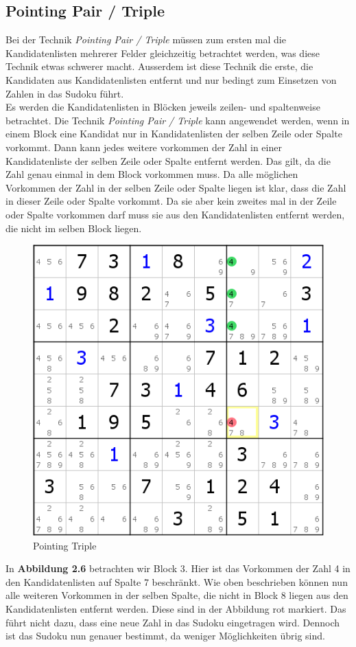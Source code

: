 \newpage
\subsection{Pointing Pair / Triple}
Bei der Technik \textit{Pointing Pair / Triple} müssen zum ersten mal die Kandidatenlisten mehrerer Felder gleichzeitig betrachtet werden, was diese Technik etwas schwerer macht. Ausserdem ist diese Technik die erste, die Kandidaten aus Kandidatenlisten entfernt und nur bedingt zum Einsetzen von Zahlen in das Sudoku führt.\\
Es werden die Kandidatenlisten in Blöcken jeweils zeilen- und spaltenweise betrachtet. Die Technik \textit{Pointing Pair / Triple}
kann angewendet werden, wenn in einem Block eine Kandidat nur in Kandidatenlisten der selben Zeile oder Spalte vorkommt. Dann kann jedes weitere vorkommen der Zahl in einer Kandidatenliste der selben Zeile oder Spalte entfernt werden. Das gilt, da die Zahl genau einmal in dem Block vorkommen muss. Da alle möglichen Vorkommen der Zahl in der selben Zeile oder Spalte liegen ist klar, dass die Zahl in dieser Zeile oder Spalte vorkommt. Da sie aber kein zweites mal in der Zeile oder Spalte vorkommen darf muss sie aus den Kandidatenlisten entfernt werden, die nicht im selben Block liegen.

\begin{figure}[h]
\begin{center}
\includegraphics{./img/pointing_triple.png}
\caption{Pointing Triple}
\end{center}
\end{figure}

In \textbf{Abbildung 2.6} betrachten wir Block 3. Hier ist das Vorkommen der Zahl 4 in den Kandidatenlisten auf Spalte 7 beschränkt. Wie oben beschrieben können nun alle weiteren Vorkommen in der selben Spalte, die nicht in Block 8 liegen aus den Kandidatenlisten entfernt werden. Diese sind in der Abbildung rot markiert. Das führt nicht dazu, dass eine neue Zahl in das Sudoku eingetragen wird. Dennoch ist das Sudoku nun genauer bestimmt, da weniger Möglichkeiten übrig sind.